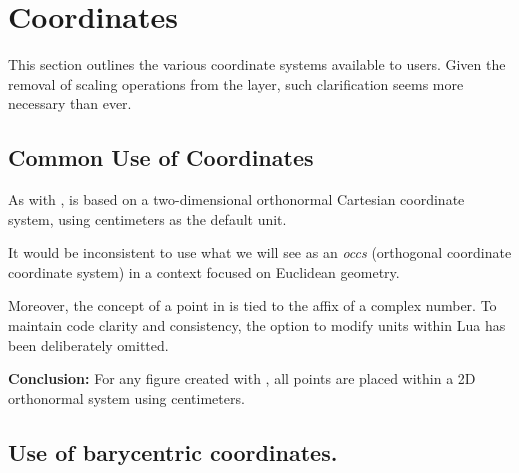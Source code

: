 \newpage\section{Coordinates} %
\label{sec:coordinates}
This section outlines the various coordinate systems available to users. Given the removal of scaling operations from the  layer, such clarification seems more necessary than ever.


\subsection{Common Use of Coordinates} %
\label{sub:common_use_of_coordinates}
As with ,  is based on a two-dimensional orthonormal Cartesian coordinate system, using centimeters as the default unit.

It would be inconsistent to use what we will see  as an \emph{occs} (orthogonal coordinate coordinate system) in a context focused on Euclidean geometry.

Moreover, the concept of a point in  is tied to the affix of a complex number. To maintain code clarity and consistency, the option to modify units within Lua has been deliberately omitted.

\medskip
\noindent
\textbf{Conclusion:} For any figure created with , all points are placed within a 2D orthonormal system using centimeters.


\subsection{Use of barycentric coordinates.} %
\label{sub:use_of_barycentric_coordinates}

